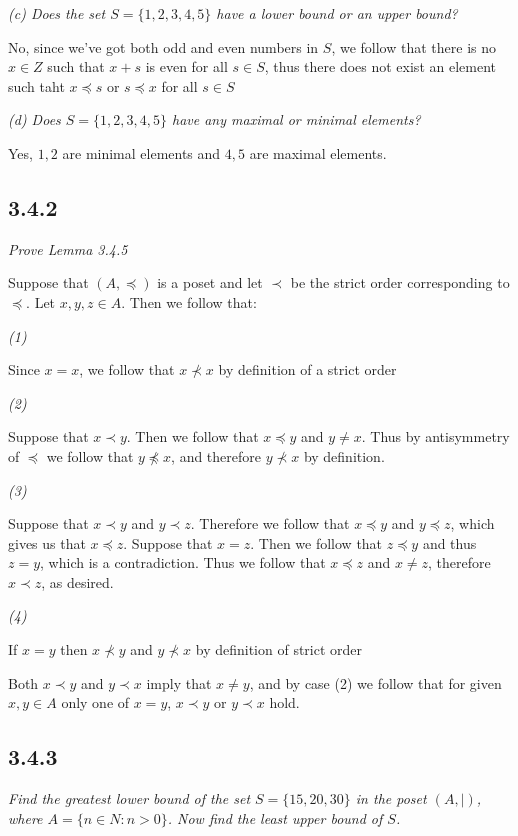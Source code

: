 \documentclass[11pt,oneside,titlepage]{book}
\begin{document}
\textit{(c) Does the  set $S = \{1, 2, 3, 4, 5\}$ have a lower bound or an upper bound?}

No, since we've got both odd and even numbers in $S$, we follow that there is no $x \in Z$ such that
$x + s$ is even for all $s \in S$, thus there does not exist an element such taht
$x \preceq s$ or $s \preceq x$ for all $s \in S$

\textit{(d) Does $S = \{1, 2, 3, 4, 5\}$ have any maximal or minimal elements?}

Yes, $1, 2$ are minimal elements and $4, 5$ are maximal elements.


\subsection*{3.4.2}

\textit{Prove Lemma 3.4.5}

Suppose that $(A, \preceq)$ is a poset and let $\prec$ be the strict order corresponding to
$\preceq$. Let $x, y, z \in A$. Then we follow that:

\textit{(1)}

Since $x = x$, we follow that $x \not \prec x$ by definition of a strict order

\textit{(2)}

Suppose that $x \prec y$. Then we follow that $x \preceq y$ and $y \neq x$. Thus by antisymmetry
of $\preceq$ we follow that $y \not \preceq x$, and therefore $y \not \prec x$ by definition.

\textit{(3)}

Suppose that $x \prec y$ and $y \prec z$. Therefore we follow that $x \preceq y$ and $y \preceq z$,
which gives us that $x \preceq z$. Suppose that $x = z$. Then we follow that $z \preceq y$
and thus $z = y$, which is a contradiction. Thus we follow that $x \preceq z$ and $x \neq z$,
therefore $x \prec z$, as desired.

\textit{(4)}

If $x = y$ then $x \not \prec y$ and $y \not \prec x$ by definition of strict order

Both $x \prec y$ and $y \prec x$ imply that $x \neq y$, and by case (2) we follow that
for given $x, y \in A$ only one of $x = y$, $x \prec y$ or $y \prec x$ hold.

\subsection*{3.4.3}

\textit{Find the greatest lower bound of the set $S = \{15, 20, 30\}$ in the poset
  $(A, |)$, where $A = \{n \in N: n > 0\}$. Now find the least upper bound of $S$.}
\end{document}
